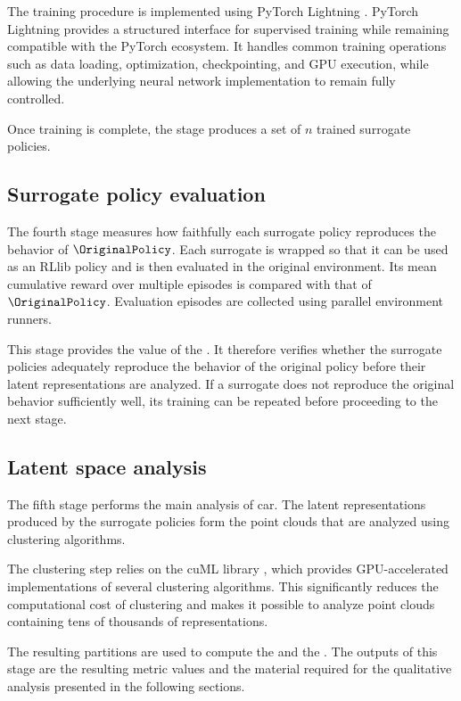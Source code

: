 The training procedure is implemented using PyTorch Lightning \cite{falcon2019lightning}.
PyTorch Lightning provides a structured interface for supervised training while remaining compatible with the PyTorch ecosystem.
It handles common training operations such as data loading, optimization, checkpointing, and GPU execution, while allowing the underlying neural network implementation to remain fully controlled.

Once training is complete, the stage produces a set of $n$ trained surrogate policies.

\subsection{Surrogate policy evaluation}

The fourth stage measures how faithfully each surrogate policy reproduces the behavior of $\OriginalPolicy$.
Each surrogate is wrapped so that it can be used as an RLlib policy and is then evaluated in the original environment.
Its mean cumulative reward over multiple episodes is compared with that of $\OriginalPolicy$.
Evaluation episodes are collected using parallel environment runners.

This stage provides the value of the \BehaviorReconstructionName.
It therefore verifies whether the surrogate policies adequately reproduce the behavior of the original policy before their latent representations are analyzed.
If a surrogate does not reproduce the original behavior sufficiently well, its training can be repeated before proceeding to the next stage.

\subsection{Latent space analysis}

The fifth stage performs the main analysis of \gls{car}.
The latent representations produced by the surrogate policies form the point clouds that are analyzed using clustering algorithms.

The clustering step relies on the cuML library \cite{raschka2020cuml}, which provides GPU-accelerated implementations of several clustering algorithms.
This significantly reduces the computational cost of clustering and makes it possible to analyze point clouds containing tens of thousands of representations.

The resulting partitions are used to compute the \ClusteringUniversalityName and the \AbstractionScoreName.
The outputs of this stage are the resulting metric values and the material required for the qualitative analysis presented in the following sections.
